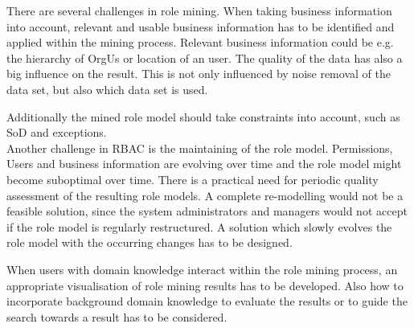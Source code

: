 There are several challenges in role mining. When taking business information into account, relevant and usable business information has to be identified and applied within the mining process. Relevant business information could be e.g. the hierarchy of \glspl{OrgU} or location of an user. The quality of the data has also a big influence on the result. This is not only influenced by noise removal of the data set, but also which data set is used.
\iffalse
In order to meet the least privileged access principle, a data set, which describes the actual user activity and usage of permissions is preferable. These information can come from system logs, which truly records the permission-usage and permission-update information. \cite{Molloy}\\
\fi

Additionally the mined role model should take constraints into account, such as \gls{SoD} and exceptions. \cite{Lu}\\

Another challenge in \gls{RBAC} is the maintaining of the role model. Permissions, Users and business information are evolving over time and the role model might become suboptimal over time. There is a practical need for periodic quality assessment of the resulting role models. \cite{Kunz} A complete re-modelling would not be a feasible solution, since the system administrators and managers would not accept if the role model is regularly restructured. A solution which slowly evolves the role model with the occurring changes has to be designed.


When users with domain knowledge interact within the role mining process, an appropriate visualisation of role mining results has to be developed. Also how to incorporate background domain knowledge to evaluate the results or to guide the search towards a result has to be considered. \cite{Han}\\

\iffalse
Currently researchers are looking into using artificial intelligence (AI) techniques to design role mining algorithms. \cite{DuChang}
\fi

